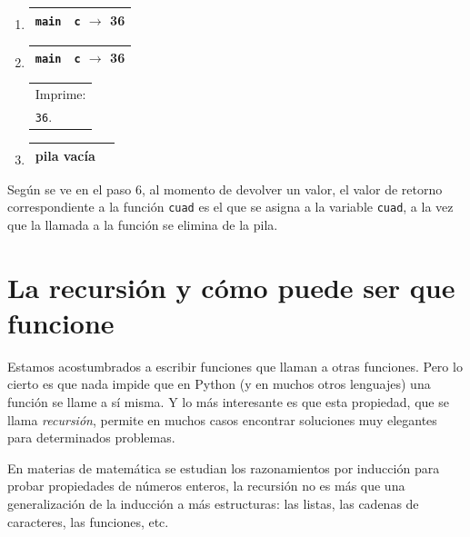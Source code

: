 \begin{enumerate}
\item {}
	\begin{tabular}{r|l|}
	\hline
	\currentframe \verb|main|&\verb|c| $\rightarrow$ 36\\
	\hline
	\end{tabular}

\item {}
	\begin{tabular}{r|l|}
	\hline
	\currentframe \verb|main|&\verb|c| $\rightarrow$ 36\\
	\hline
	\end{tabular}
	\begin{tabular}{l}
	Imprime:\\
	\verb|36|.
	\end{tabular}

\item \makebox[5cm][l]{}
	\begin{tabular}{r|l|}
	\hline
	\currentframe pila vacía\\
	\hline
	\end{tabular}

\end{enumerate}

Según se ve en el paso 6, al momento de devolver un valor, el valor de
retorno correspondiente a la función \lstinline!cuad! es el que se
asigna a la variable \lstinline!cuad!, a la vez que la llamada a la función
se elimina de la pila.

\newpage
\section{La recursión y cómo puede ser que funcione}

Estamos acostumbrados a escribir funciones que llaman a otras funciones.
Pero lo cierto es que nada impide que en Python (y en muchos otros
lenguajes) una función se llame a sí misma. Y lo más interesante es que
esta propiedad, que se llama {\it recursión}, permite en muchos casos
encontrar soluciones muy elegantes para determinados problemas.

En materias de matemática se estudian los razonamientos por inducción para
probar propiedades de números enteros, la recursión no es más que una
generalización de la inducción a más estructuras: las listas, las cadenas
de caracteres, las funciones, etc.

